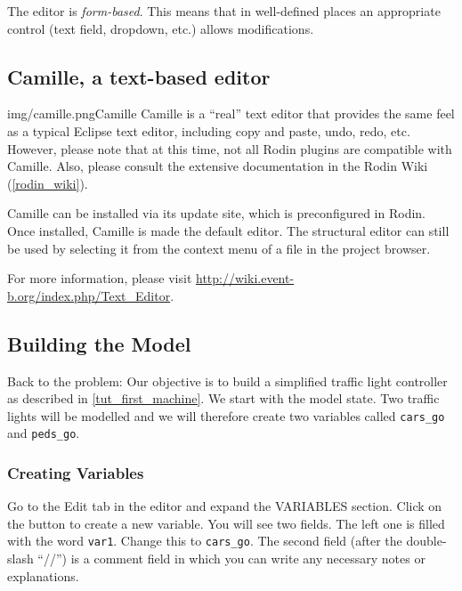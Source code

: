 The editor is \textit{form-based}.  This means that in well-defined places an appropriate control (text field, dropdown, etc.) allows modifications.


\subsection{Camille, a text-based editor}
\label{tut_camille}
\begin{rodin-plugin}{img/camille.png}{Camille}
Camille is a ``real'' text editor that provides the same feel as a typical Eclipse text editor, including copy and paste, undo, redo, etc.  However, please note that at this time, not all Rodin plugins are compatible with Camille.  Also, please consult the extensive documentation in the Rodin Wiki (\ref{rodin_wiki}).

Camille can be installed via its update site, which is preconfigured in Rodin.  Once installed, Camille is made the default editor.  The structural editor can still be used by selecting it from the context menu of a file in the project browser.

For more information, please visit \url{http://wiki.event-b.org/index.php/Text_Editor}.


\end{rodin-plugin}

\subsection{Building the Model}
\label{tut_building_the_model}

Back to the problem: Our objective is to build a simplified traffic light controller as described in \ref{tut_first_machine}.  We start with the model state.  Two traffic lights will be modelled and we will therefore create two variables called  \texttt{cars\_go} and \texttt{peds\_go}.  

\subsubsection{Creating Variables}
Go to the \textsf{Edit} tab in the editor and expand the \textsf{VARIABLES} section.  Click on the  button to create a new variable.
You will see two fields. The left one is filled with the word \texttt{var1}.  Change this to \texttt{cars\_go}.  The second field (after the double-slash ``//'') is a comment field in which you can write any necessary notes or explanations.

